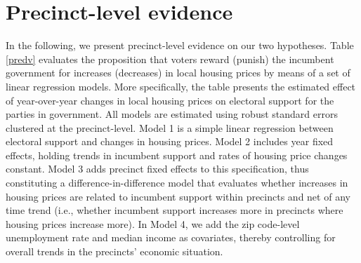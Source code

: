 \documentclass[12pt,a4paper]{article}
\begin{document}
	\section{Precinct-level evidence} \label{inference}
	In the following, we present precinct-level evidence on our two hypotheses. Table \ref{predv}  evaluates the proposition that voters reward (punish) the incumbent government for increases (decreases) in local housing prices by means of a set of linear regression models. More specifically, the table presents the estimated effect of year-over-year changes in local housing prices on electoral support for the parties in government. All models are estimated using robust standard errors clustered at the precinct-level. Model 1 is a simple linear regression between electoral support and changes in housing prices. Model 2 includes year fixed effects, holding trends in incumbent support and rates of housing price changes constant. Model 3 adds precinct fixed effects to this specification, thus constituting a difference-in-difference model that evaluates whether increases in housing prices are related to incumbent support within precincts and net of any time trend (i.e., whether incumbent support increases more in precincts where housing prices increase more). In Model 4, we add the zip code-level unemployment rate and median income as covariates, thereby controlling for overall trends in the precincts’ economic situation. 
	
	
	
\end{document}
